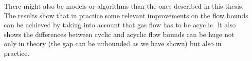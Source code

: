 There might also be models or algorithms than the ones described in this thesis. The results show that in 
practice some relevant improvements on the flow bounds can be achieved by taking into account that gas flow has to be 
acyclic. It also shows the differences between cyclic and acyclic flow bounds can be huge not only in theory (the gap 
can be unbounded as we have shown) but also in practice.
